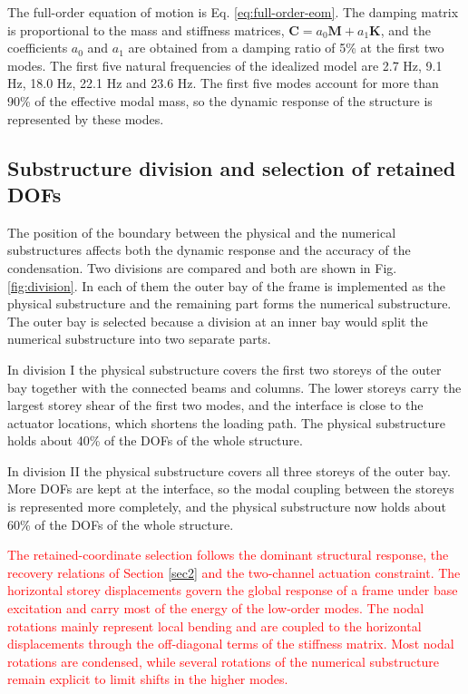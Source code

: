 \documentclass[11pt,a4paper]{article}
\numberwithin{equation}{section}
\newcommand{\rev}[1]{\textcolor{red}{#1}}
\begin{document}
The full-order equation of motion is Eq. \eqref{eq:full-order-eom}. The damping matrix is proportional to the mass and stiffness matrices, \(\mathbf{C}=a_{0}\mathbf{M}+a_{1}\mathbf{K}\), and the coefficients \(a_{0}\) and \(a_{1}\) are obtained from a damping ratio of 5\% at the first two modes. The first five natural frequencies of the idealized model are 2.7 Hz, 9.1 Hz, 18.0 Hz, 22.1 Hz and 23.6 Hz. The first five modes account for more than 90\% of the effective modal mass, so the dynamic response of the structure is represented by these modes.

\subsection{Substructure division and selection of retained DOFs}
\label{sec:division}

The position of the boundary between the physical and the numerical substructures affects both the dynamic response and the accuracy of the condensation. Two divisions are compared and both are shown in Fig. \ref{fig:division}. In each of them the outer bay of the frame is implemented as the physical substructure and the remaining part forms the numerical substructure. The outer bay is selected because a division at an inner bay would split the numerical substructure into two separate parts.

In division I the physical substructure covers the first two storeys of the outer bay together with the connected beams and columns. The lower storeys carry the largest storey shear of the first two modes, and the interface is close to the actuator locations, which shortens the loading path. The physical substructure holds about 40\% of the DOFs of the whole structure.

In division II the physical substructure covers all three storeys of the outer bay. More DOFs are kept at the interface, so the modal coupling between the storeys is represented more completely, and the physical substructure now holds about 60\% of the DOFs of the whole structure.

\rev{The retained-coordinate selection follows the dominant structural response, the recovery relations of Section \ref{sec2} and the two-channel actuation constraint. The horizontal storey displacements govern the global response of a frame under base excitation and carry most of the energy of the low-order modes. The nodal rotations mainly represent local bending and are coupled to the horizontal displacements through the off-diagonal terms of the stiffness matrix. Most nodal rotations are condensed, while several rotations of the numerical substructure remain explicit to limit shifts in the higher modes.}
\end{document}
